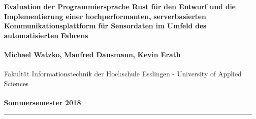 \renewcommand{\footnoterule}{\hspace{-0.5cm}\rule{6cm}{1pt}{\vspace*{2pt}}}
\begin{center}
\newcommand{\WatzkoMichaelThema}{Evaluation der Programmiersprache Rust für den Entwurf und die Implementierung einer hochperformanten, serverbasierten Kommunikationsplattform für Sensordaten im Umfeld des automatisierten Fahrens}
		\baselineskip15pt
		\textbf{\textcolor{hs_dunkelblau}{\large{	Evaluation der Programmiersprache Rust für den
		Entwurf und die Implementierung einer hochperformanten,
		serverbasierten Kommunikationsplattform für Sensordaten
		im Umfeld des automatisierten Fahrens}}}\\\ \\
		\baselineskip10pt
\newcommand{\WatzkoMichael}{Michael \newline Watzko}
		\textbf{\textcolor{hs_dunkelblau}{Michael Watzko\label{WatzkoMichael},}\hspace{0.5cm}}
\textbf{\textcolor{hs_dunkelblau}{
Manfred Dausmann,}}
\hspace{.5cm}\textbf{\textcolor{hs_dunkelblau}{
Kevin Erath}}
\textcolor{hs_dunkelblau}{\\\ \\Fakultät Informationstechnik der Hochschule Esslingen - University of Applied Sciences}\\\ \\
\textcolor{hs_dunkelblau}{\textbf{Sommersemester 2018}}
\color{hs_dunkelblau}\rule{\linewidth}{1.5pt}
\end{center}
\setcounter{figure}{0}
